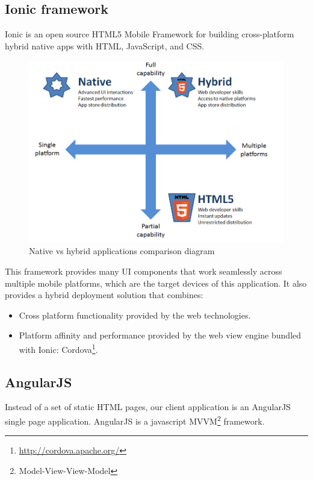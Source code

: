 \documentclass[a4paper]{article}
\begin{document}
\subsection{Ionic framework}
\label{sec: ionic}

Ionic is an open source HTML5 Mobile Framework for building cross-platform hybrid native apps with HTML, JavaScript, and CSS.

\begin{figure}[h!]
\centerline{\includegraphics[height=8cm, width=13cm]{nativeVsHybrid.png}}
\caption{Native vs hybrid applications comparison diagram}
\end{figure}

This framework provides many UI components that work seamlessly across multiple mobile platforms, which are the target devices of this application. It also provides a hybrid deployment solution that combines:

\begin{itemize}
	\item Cross platform functionality provided by the web technologies.
    \item Platform affinity and performance provided by the web view engine bundled with Ionic: Cordova\footnote{\url{http://cordova.apache.org/}}.
\end{itemize}

\newpage

\subsection{AngularJS}
\label{sec: angular}

Instead of a set of static HTML pages, our client application is an AngularJS single page application. AngularJS is a javascript MVVM\footnote{Model-View-View-Model} framework.
\end{document}
